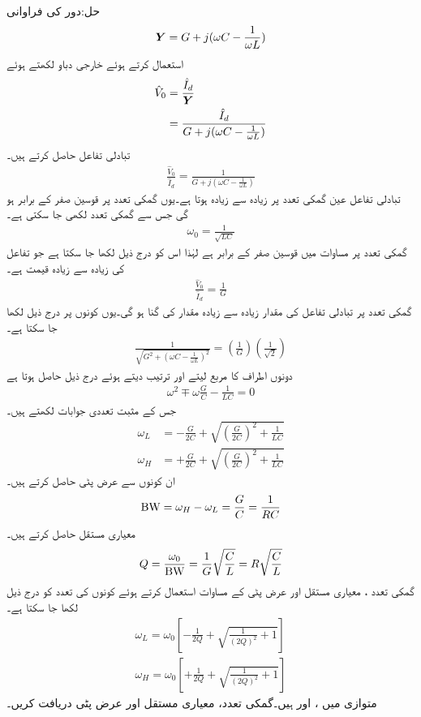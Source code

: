 حل:دور کی فراوانی
\begin{align*}
{\ensuremath{{\boldsymbol{Y}}}}=G+j(\omega C-\frac{1}{\omega L})
\end{align*}
استعمال کرتے ہوئے خارجی دباو لکھتے ہوئے
\begin{align*}
\hat{V}_0&=\frac{\hat{I}_d}{{{\boldsymbol{Y}}}}\\
&=\frac{\hat{I}_d}{G+j(\omega C-\frac{1}{\omega L})}
\end{align*}
تبادلی تفاعل حاصل کرتے ہیں۔
\begin{align}\label{مساوات_تعددی_متوازی_تبادلی_تفاعل_داخلی_رو}
\frac{\hat{V}_0}{\hat{I}_d}=\frac{1}{G+j(\omega C-\frac{1}{\omega L})}
\end{align}
تبادلی تفاعل عین گمکی تعدد پر زیادہ سے زیادہ ہوتا ہے۔یوں گمکی تعدد پر قوسین صفر کے برابر ہو گی جس سے گمکی تعدد لکھی جا سکتی ہے۔
\begin{align}
\omega_0=\frac{1}{\sqrt{LC}}
\end{align}
گمکی تعدد پر مساوات  میں قوسین صفر کے برابر ہے لہٰذا اس کو درج ذیل لکھا جا سکتا ہے جو تفاعل کی زیادہ سے زیادہ قیمت ہے۔
\begin{align}\label{مساوات_تعددی_متوازی_تبادلی_تفاعل_زیادہ}
\frac{\hat{V}_0}{\hat{I}_d}=\frac{1}{G}
\end{align}
گمکی تعدد پر تبادلی تفاعل کی مقدار زیادہ سے زیادہ مقدار کی  گنا ہو گی۔یوں کونوں پر درج ذیل لکھا جا سکتا ہے۔
\begin{align}
\frac{1}{\sqrt{G^2+(\omega C-\frac{1}{\omega L})^2}}=\left(\frac{1}{G}\right)\left(\frac{1}{\sqrt{2}}\right)
\end{align}
دونوں اطراف کا مربع لیتے اور ترتیب دیتے ہوئے درج ذیل حاصل ہوتا ہے
\begin{align}
\omega^2\mp \omega \frac{G}{C} -\frac{1}{LC}=0
\end{align}
جس کے مثبت تعددی جوابات لکھتے ہیں۔
\begin{align}
\omega_{L}&=-\frac{G}{2C}+\sqrt{\left(\frac{G}{2C}\right)^2+\frac{1}{LC}}\\
\omega_{H}&=+\frac{G}{2C}+\sqrt{\left(\frac{G}{2C}\right)^2+\frac{1}{LC}}
\end{align}
ان کونوں سے عرض پٹی حاصل کرتے ہیں۔
\begin{align}
{\ensuremath{{\textup{BW}}}}=\omega_{H}-\omega_{L}=\frac{G}{C}=\frac{1}{RC}
\end{align}
معیاری مستقل حاصل کرتے ہیں۔
\begin{align}
Q=\frac{\omega_0}{{{\textup{BW}}}}=\frac{1}{G}\sqrt{\frac{C}{L}}=R\sqrt{\frac{C}{L}}
\end{align}
گمکی تعدد ، معیاری مستقل اور عرض پٹی کے مساوات استعمال کرتے ہوئے کونوں کی تعدد کو درج ذیل لکھا جا سکتا ہے۔
\begin{align}
\omega_{L}=\omega_0 \left[-\frac{1}{2Q}+\sqrt{\frac{1}{(2Q)^2}+1}\right]\\
\omega_{H}=\omega_0 \left[+\frac{1}{2Q}+\sqrt{\frac{1}{(2Q)^2}+1}\right]
\end{align}
متوازی  میں ،  اور  ہیں۔گمکی تعدد، معیاری مستقل اور عرض پٹی دریافت کریں۔

